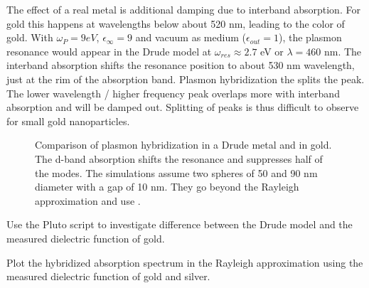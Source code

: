 The effect of a real metal is additional damping due to interband absorption. For gold this happens at wavelengths below about 520 nm, leading to the color of gold. With $\omega_P = 9 eV$, $\epsilon_\infty = 9$ and vacuum as medium ($\epsilon_{out} = 1$), the plasmon resonance would appear in the Drude model at $\omega_{res} \approx 2.7$ eV or $\lambda = 460$ nm. The interband absorption shifts the resonance position to about 530 nm wavelength, just at the rim of the absorption band. Plasmon hybridization the splits the peak. The lower wavelength / higher frequency peak overlaps more with interband absorption and will be damped out. Splitting of peaks is thus difficult to observe for small gold nanoparticles.

\begin{figure}
\caption{Comparison of plasmon hybridization in a Drude metal and in gold. The d-band absorption shifts the resonance and suppresses half of the modes. The simulations assume two spheres of 50 and 90 nm diameter with a gap of 10 nm. They go beyond the Rayleigh approximation and use \cite{tmatrix-book06}.}
\end{figure}

\begin{questions}
\item Use the Pluto script to investigate  difference between the Drude model and the measured dielectric function of gold.

\item Plot the hybridized absorption spectrum in the Rayleigh approximation using the measured dielectric function of gold and silver.
\end{questions}
 



\printbibliography[segment=\therefsegment,heading=subbibliography]

